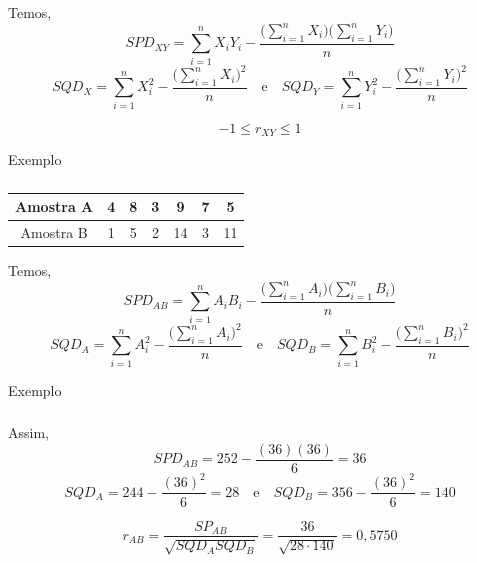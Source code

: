 \documentclass[14pt,aspectratio=1610]{beamer}
\begin{document}
\begin{frame}{}
\frametitle{}
\begin{block}{}
\justifying
Temos,
$$SPD_{XY}=\sum_{i=1}^{n}X_{i}Y_{i}-\dfrac{\Big({\displaystyle\sum_{i=1}^{n}X_{i}}\Big)\Big({\displaystyle\sum_{i=1}^{n}Y_{i}\Big)}}{n}$$
\pause
$$SQD_{X}=\displaystyle{\sum_{i=1}^{n}X_{i}^{2}}-\dfrac{\Big(\displaystyle{\sum_{i=1}^{n}X_{i}}\Big)^{2}}{n}\quad \textrm{e}\quad SQD_{Y}=\displaystyle{\sum_{i=1}^{n}Y_{i}^{2}}-\dfrac{\Big(\displaystyle{\sum_{i=1}^{n}Y_{i}}\Big)^{2}}{n}$$
\end{block}
\pause
\vspace{-0.06cm}
\begin{block}{}
\justifying
$$-1\leq r_{XY}\leq 1$$
\end{block}
\end{frame}

\begin{frame}{Exemplo}
\frametitle{}
\begin{block}{}
\justifying
\begin{table}[H]
        \centering
        \begin{tabular}{c|cccccc}
             Amostra A&4&8&3&9&7&5 \\
             \hline
             Amostra B&1&5&2&14&3&11 
        \end{tabular}
    \end{table}
\end{block}
\begin{block}{}
\justifying
Temos,
$$SPD_{AB}=\sum_{i=1}^{n}A_{i}B_{i}-\dfrac{\Big({\displaystyle\sum_{i=1}^{n}A_{i}}\Big)\Big({\displaystyle\sum_{i=1}^{n}B_{i}\Big)}}{n}$$
\pause
$$SQD_{A}=\displaystyle{\sum_{i=1}^{n}A_{i}^{2}}-\dfrac{\Big(\displaystyle{\sum_{i=1}^{n}A_{i}}\Big)^{2}}{n}\quad \textrm{e}\quad SQD_{B}=\displaystyle{\sum_{i=1}^{n}B_{i}^{2}}-\dfrac{\Big(\displaystyle{\sum_{i=1}^{n}B_{i}}\Big)^{2}}{n}$$
\end{block}
\end{frame}

\begin{frame}{Exemplo}
\frametitle{}
\begin{block}{}
\justifying
Assim,
$$SPD_{AB}=252-\dfrac{(36)(36)}{6}=36$$
\pause
$$SQD_{A}=244-\dfrac{(36)^{2}}{6}=28\quad \textrm{e}\quad SQD_{B}=356-\dfrac{(36)^{2}}{6}=140$$
\end{block}
\pause
\begin{block}{}
\justifying
$$r_{AB}=\dfrac{SP_{AB}}{\sqrt{SQD_{A}SQD_{B}}}=\dfrac{36}{\sqrt{28\cdot 140}}=0,5750$$
\end{block}
\end{frame}
\end{document}
